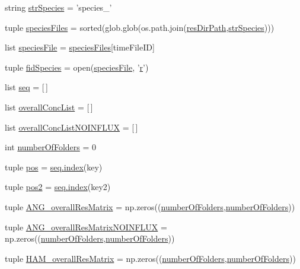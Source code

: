 \begin{DoxyCompactItemize}
\item 
string \hyperlink{a00091_ac1f05e7db61bcc83ea1ed27460462202}{str\-Species} = 'species\-\_\-'
\item 
tuple \hyperlink{a00091_a18645475f8596346ca431e99661b5674}{species\-Files} = sorted(glob.\-glob(os.\-path.\-join(\hyperlink{a00091_a28ca19f0f566396ef664e068a41a2837}{res\-Dir\-Path},\hyperlink{a00091_ac1f05e7db61bcc83ea1ed27460462202}{str\-Species})))
\item 
list \hyperlink{a00091_a3c620554bbf7ae30d97a60565fea8d1e}{species\-File} = \hyperlink{a00091_a18645475f8596346ca431e99661b5674}{species\-Files}\mbox{[}time\-File\-I\-D\mbox{]}
\item 
tuple \hyperlink{a00091_a70d70b9ab98e722475b03465c7f8dbbe}{fid\-Species} = open(\hyperlink{a00091_a3c620554bbf7ae30d97a60565fea8d1e}{species\-File}, '\hyperlink{a00025_ac862e7284527eb913b1351c8bfb8e079}{r}')
\item 
list \hyperlink{a00091_a1bdf98839177836f238806755e46ac3c}{seq} = \mbox{[}$\,$\mbox{]}
\item 
list \hyperlink{a00091_a2cebadd75179c46e551a2facbdd2741b}{overall\-Conc\-List} = \mbox{[}$\,$\mbox{]}
\item 
list \hyperlink{a00091_ad7eab833592c6cd395f9e2416dd13920}{overall\-Conc\-List\-N\-O\-I\-N\-F\-L\-U\-X} = \mbox{[}$\,$\mbox{]}
\item 
int \hyperlink{a00091_a3a2fe097086bb0f4a505fca8f53dc2b0}{number\-Of\-Folders} = 0
\item 
tuple \hyperlink{a00091_aa39692272363cd6f687c4b2a53f96594}{pos} = \hyperlink{a00054_a0cd6a44ffb07342cbc7e5ac33bfc9495}{seq.\-index}(key)
\item 
tuple \hyperlink{a00091_a49fec7e1deea4728b5ef4a487d155de9}{pos2} = \hyperlink{a00054_a0cd6a44ffb07342cbc7e5ac33bfc9495}{seq.\-index}(key2)
\item 
tuple \hyperlink{a00091_a15adfffa273548845cea67d8b89f0bb1}{A\-N\-G\-\_\-overall\-Res\-Matrix} = np.\-zeros((\hyperlink{a00091_a3a2fe097086bb0f4a505fca8f53dc2b0}{number\-Of\-Folders},\hyperlink{a00091_a3a2fe097086bb0f4a505fca8f53dc2b0}{number\-Of\-Folders}))
\item 
tuple \hyperlink{a00091_a7b0e67be0cf8de69432bdf56919d9e33}{A\-N\-G\-\_\-overall\-Res\-Matrix\-N\-O\-I\-N\-F\-L\-U\-X} = np.\-zeros((\hyperlink{a00091_a3a2fe097086bb0f4a505fca8f53dc2b0}{number\-Of\-Folders},\hyperlink{a00091_a3a2fe097086bb0f4a505fca8f53dc2b0}{number\-Of\-Folders}))
\item 
tuple \hyperlink{a00091_a5e8d5d65865736555e76c3f04058ddd9}{H\-A\-M\-\_\-overall\-Res\-Matrix} = np.\-zeros((\hyperlink{a00091_a3a2fe097086bb0f4a505fca8f53dc2b0}{number\-Of\-Folders},\hyperlink{a00091_a3a2fe097086bb0f4a505fca8f53dc2b0}{number\-Of\-Folders}))

\end{DoxyCompactItemize}
